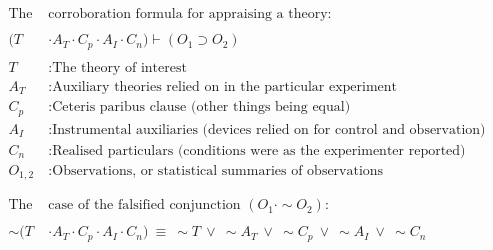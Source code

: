 \documentclass[fleqn]{article}
\begin{document}
\begin{align*}
\text{The } & \text{corroboration formula for appraising a theory:}\\
\\
(T&\cdot A_{T} \cdot C_{p} \cdot A_{I} \cdot C_{n} ) \vdash (O_{1}\supset O_{2})\\
\\
T &: \text{The theory of interest}\\
A_{T} &: \text{Auxiliary theories relied on in the particular experiment} \\
C_{p} &: \text{Ceteris paribus clause (other things being equal)} \\
A_{I} &: \text{Instrumental auxiliaries (devices relied on for control and observation)} \\
C_{n} &: \text{Realised particulars (conditions were as the experimenter reported)} \\
O_{1,2} &: \text{Observations, or statistical summaries of observations} \\
\\
\\
\text{The } & \text{case of the falsified conjunction } (O_{1} \cdot \sim O_{2}):\\
\\
\sim(T&\cdot A_{T} \cdot C_{p} \cdot A_{I} \cdot C_{n} )\ \equiv \ \sim T\ \vee\ \sim A_{T}\ \vee\ \sim C_{p}\ \vee\ \sim A_{I}\ \vee\ \sim C_{n} \\
\end{align*}
\end{document}
